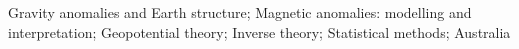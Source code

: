 Gravity anomalies and Earth structure;
Magnetic anomalies: modelling and interpretation;
Geopotential theory;
Inverse theory;
Statistical methods;
Australia
